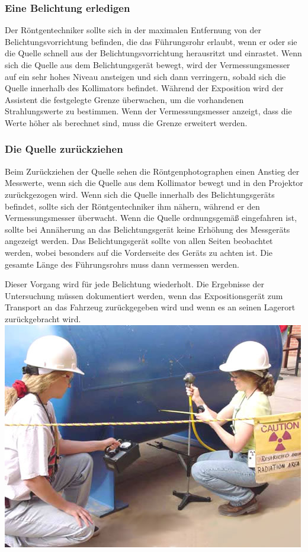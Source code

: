 {\subsubsection{Eine Belichtung erledigen}

Der Röntgentechniker sollte sich in der maximalen Entfernung von der Belichtungsvorrichtung befinden, die das Führungsrohr erlaubt, wenn er oder sie die Quelle schnell aus der Belichtungsvorrichtung herausritzt und einrastet. Wenn sich die Quelle aus dem Belichtungsgerät bewegt, wird der Vermessungsmesser auf ein sehr hohes Niveau ansteigen und sich dann verringern, sobald sich die Quelle innerhalb des Kollimators befindet. Während der Exposition wird der Assistent die festgelegte Grenze überwachen, um die vorhandenen Strahlungswerte zu bestimmen. Wenn der Vermessungsmesser anzeigt, dass die Werte höher als berechnet sind, muss die Grenze erweitert werden.
\subsubsection{Die Quelle zurückziehen}
Beim Zurückziehen der Quelle sehen die Röntgenphotographen einen Anstieg der Messwerte, wenn sich die Quelle aus dem Kollimator bewegt und in den Projektor zurückgezogen wird. Wenn sich die Quelle innerhalb des Belichtungsgeräts befindet, sollte sich der Röntgentechniker ihm nähern, während er den Vermessungsmesser überwacht. Wenn die Quelle ordnungsgemäß eingefahren ist, sollte bei Annäherung an das Belichtungsgerät keine Erhöhung des Messgeräts angezeigt werden. Das Belichtungsgerät sollte von allen Seiten beobachtet werden, wobei besonders auf die Vorderseite des Geräts zu achten ist. Die gesamte Länge des Führungsrohrs muss dann vermessen werden.

Dieser Vorgang wird für jede Belichtung wiederholt. Die Ergebnisse der Untersuchung müssen dokumentiert werden, wenn das Expositionsgerät zum Transport an das Fahrzeug zurückgegeben wird und wenn es an seinen Lagerort zurückgebracht wird.\\
\includegraphics[scale=0.7]{img/isotope-radiography-pressure-vessel.jpg}\\
}
